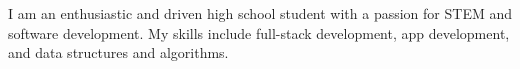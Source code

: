 

\begin{cvparagraph}I am an enthusiastic and driven high school student with a passion for STEM and software development. My skills include full-stack development, app development, and data structures and algorithms.\end{cvparagraph}